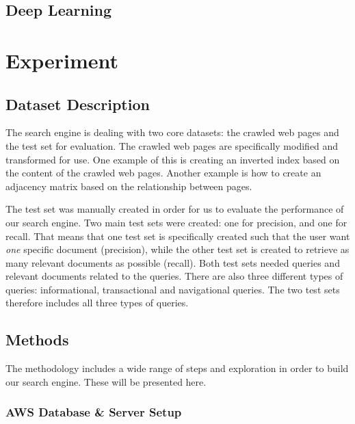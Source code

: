 
\subsection{Deep Learning} %
\label{sub:deep_learning}


\section{Experiment} %
\label{sec:experiment}

\subsection{Dataset Description} %
\label{sub:dataset_description}

The search engine is dealing with two core datasets: the crawled web pages and the test set for evaluation. The crawled web pages are specifically modified and transformed for use. One example of this is creating an inverted index based on the content of the crawled web pages. Another example is how to create an adjacency matrix based on the relationship between pages.

The test set was manually created in order for us to evaluate the performance of our search engine. Two main test sets were created: one for precision, and one for recall. That means that one test set is specifically created such that the user want \emph{one} specific document (precision), while the other test set is created to retrieve as many relevant documents as possible (recall). Both test sets needed queries and relevant documents related to the queries. There are also three different types of queries: informational, transactional and navigational queries. The two test sets therefore includes all three types of queries.


\subsection{Methods} %
\label{sub:methods}
The methodology includes a wide range of steps and exploration in order to build our search engine. These will be presented here.

\subsubsection{AWS Database \& Server Setup} %
\label{ssub:database_and_server_setup}

